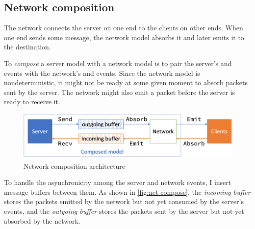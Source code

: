 \subsection{Network composition}
\label{sec:net-compose}

The network connects the server on one end to the clients on other ends.  When
one end sends some message, the network model absorbs it and later emits it to
the destination.

To {\em compose} a server model with a network model is to pair the server's
 and  events with the network's  and 
events.  Since the network model is nondeterministic, it might not be ready at
some given moment to absorb packets sent by the server.  The network might also
emit a packet before the server is ready to receive it.

\begin{figure}
  \includegraphics[width=\textwidth]{figures/net-compose}
  \caption{Network composition architecture}
  \label{fig:net-compose}
\end{figure}

To handle the asynchronicity among the server and network events, I insert
message buffers between them.  As shown in \autoref{fig:net-compose}, the {\em
  incoming buffer} stores the packets emitted by the network but not yet
consumed by the server's  events, and the {\em outgoing buffer} stores
the packets sent by the server but not yet absorbed by the network.

